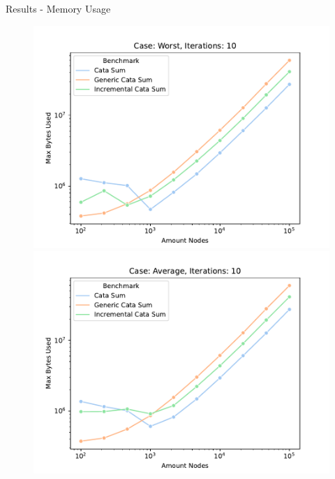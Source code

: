 \begin{slide}{Results - Memory Usage}
\begin{figure}[H]
  \begin{minipage}{.32\textwidth}
    \centering
    \includegraphics[width=\textwidth]{images/memory/Worst/10/all_benchmarks.pdf}  
  \end{minipage}
  \begin{minipage}{.32\textwidth}
    \centering
    \includegraphics[width=\textwidth]{images/memory/Average/10/all_benchmarks.pdf}  
  \end{minipage}
  \begin{minipage}{.32\textwidth}
    \centering

\end{minipage}
\end{figure}
\end{slide}
